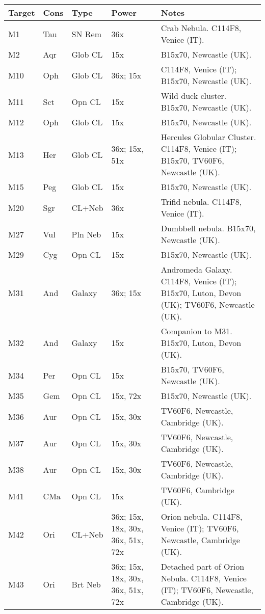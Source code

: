 \begin{longtable}{ p{0.7in}  p{0.3in}  p{0.6in}  p{0.9in}  p{5.8in} }
\hline 
{\bf Target} & {\bf Cons} & {\bf Type} & {\bf Power} & {\bf Notes} \\ 
\hline 
M1 & Tau & SN Rem & 36x & Crab Nebula. C114F8, Venice (IT). \\ 
M2 & Aqr & Glob CL & 15x & B15x70, Newcastle (UK). \\ 
M10 & Oph & Glob CL & 36x; 15x & C114F8, Venice (IT); B15x70, Newcastle (UK). \\ 
M11 & Sct & Opn CL & 15x & Wild duck cluster. B15x70, Newcastle (UK). \\ 
M12 & Oph & Glob CL & 15x & B15x70, Newcastle (UK). \\ 
M13 & Her & Glob CL & 36x; 15x, 51x & Hercules Globular Cluster. C114F8, Venice (IT); B15x70, TV60F6, Newcastle (UK). \\ 
M15 & Peg & Glob CL & 15x & B15x70, Newcastle (UK). \\ 
M20 & Sgr & CL+Neb & 36x & Trifid nebula. C114F8, Venice (IT). \\ 
M27 & Vul & Pln Neb & 15x & Dumbbell nebula. B15x70, Newcastle (UK). \\ 
M29 & Cyg & Opn CL & 15x & B15x70, Newcastle (UK). \\ 
M31 & And & Galaxy & 36x; 15x & Andromeda Galaxy. C114F8, Venice (IT); B15x70, Luton, Devon (UK); TV60F6, Newcastle (UK). \\ 
M32 & And & Galaxy & 15x & Companion to M31. B15x70, Luton, Devon (UK). \\ 
M34 & Per & Opn CL & 15x & B15x70, TV60F6, Newcastle (UK). \\ 
M35 & Gem & Opn CL & 15x, 72x & B15x70, Newcastle (UK). \\ 
M36 & Aur & Opn CL & 15x, 30x & TV60F6, Newcastle, Cambridge (UK). \\ 
M37 & Aur & Opn CL & 15x, 30x & TV60F6, Newcastle, Cambridge (UK). \\ 
M38 & Aur & Opn CL & 15x, 30x & TV60F6, Newcastle, Cambridge (UK). \\ 
M41 & CMa & Opn CL & 15x & TV60F6, Cambridge (UK). \\ 
M42 & Ori & CL+Neb & 36x; 15x, 18x, 30x, 36x, 51x, 72x & Orion nebula. C114F8, Venice (IT); TV60F6, Newcastle, Cambridge (UK). \\ 
M43 & Ori & Brt Neb & 36x; 15x, 18x, 30x, 36x, 51x, 72x & Detached part of Orion Nebula. C114F8, Venice (IT); TV60F6, Newcastle, Cambridge (UK). \\ 

\end{longtable}

